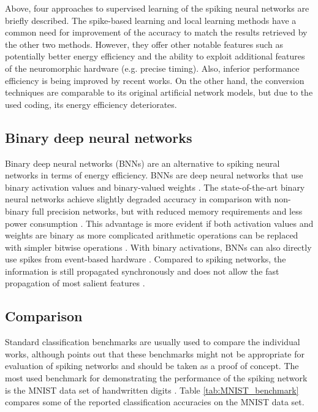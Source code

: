 Above, four approaches to supervised learning of the spiking neural networks are briefly described. The spike-based learning and local learning methods have a common need for improvement of the accuracy to match the results retrieved by the other two methods. However, they offer other notable features such as potentially better energy efficiency and the ability to exploit additional features of the neuromorphic hardware (e.g. precise timing). Also, inferior performance efficiency is being improved by recent works. On the other hand, the conversion techniques are comparable to its original artificial network models, but due to the used coding, its energy efficiency deteriorates.

\subsection{Binary deep neural networks}
Binary deep neural networks (BNNs) are an alternative to spiking neural networks in terms of energy efficiency. BNNs are deep neural networks that use binary activation values and binary-valued weights \cite{simonsReviewBinarized19}. The state-of-the-art binary neural networks achieve slightly degraded accuracy in comparison with non-binary full precision networks, but with reduced memory requirements and less power consumption \cite{courbariauxBinarizedNeural16}. This advantage is more evident if both activation values and weights are binary as more complicated arithmetic operations can be replaced with simpler bitwise operations \cite{kimBitwiseNeural16}. With binary activations, BNNs can also directly use spikes from event-based hardware \cite{linAccurateBinary17}. Compared to spiking networks, the information is still propagated synchronously and does not allow the fast propagation of most salient features \cite{pfeifferDeepLearningSpiking2018}.

\subsection{Comparison}
Standard classification benchmarks are usually used to compare the individual works, although \cite{pfeifferDeepLearningSpiking2018} points out that these benchmarks might not be appropriate for evaluation of spiking networks and should be taken as a proof of concept. The most used benchmark for demonstrating the performance of the spiking network is the MNIST data set of handwritten digits \cite{lecunGradientbasedLearning98}. Table \ref{tab:MNIST_benchmark} compares some of the reported classification accuracies on the MNIST data set.

